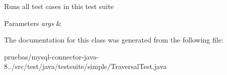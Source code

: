 Runs all test cases in this test suite


\begin{DoxyParams}{Parameters}
{\em args} & \\
\hline
\end{DoxyParams}


The documentation for this class was generated from the following file\+:\begin{DoxyCompactItemize}
\item 
pruebas/mysql-\/connector-\/java-\/8../src/test/java/testsuite/simple/Traversal\+Test.\+java\end{DoxyCompactItemize}
